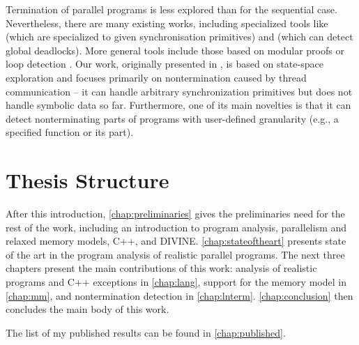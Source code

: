 Termination of parallel programs is less explored than for the sequential case.
Nevertheless, there are many existing works, including specialized tools like  (which are specialized to given synchronisation primitives) and  (which can detect global deadlocks).
More general tools include those based on modular proofs  or loop detection .
Our work, originally presented in , is based on state-space exploration and focuses primarily on nontermination caused by thread communication -- it can handle arbitrary synchronization primitives but does not handle symbolic data so far.
Furthermore, one of its main novelties is that it can detect nonterminating parts of programs with user-defined granularity (e.g., a specified function or its part).

\section{Thesis Structure}

After this introduction, \autoref{chap:preliminaries} gives the preliminaries
need for the rest of the work, including an introduction to program analysis, parallelism and relaxed memory models, C++, and DIVINE.
\autoref{chap:stateoftheart} presents state of the art in the program analysis
of realistic parallel programs.
The next three chapters present the main contributions of this work: analysis of
realistic programs and C++ exceptions in \autoref{chap:lang}, support for the
\xtso memory model in \autoref{chap:mm}, and nontermination detection in
\autoref{chap:lnterm}.
\autoref{chap:conclusion} then concludes the main body of this work.

The list of my published results can be found in \autoref{chap:published}.

